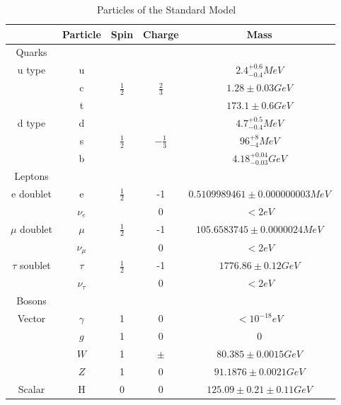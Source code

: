 \begin{table}[h]
\begin{center}
\footnotesize
\begin{tabular}[h]{|c||c|c|c|c|}
\hline
 & Particle & Spin & Charge & Mass \\
\hline\hline
Quarks &&&&\\
\hline
u type &u& & &${2.4^{+0.6}_{-0.4} MeV}$\\
 &c&${\frac{1}{2}}$&${\frac{2}{3}}$&${1.28\pm{0.03} GeV}$\\
 &t& & &${173.1\pm{0.6} GeV}$\\
\hline
d type & d& & & ${4.7^{+0.5}_{-0.4} MeV}$\\
 & s & ${\frac{1}{2}}$ & ${-\frac{1}{3}}$ & ${96^{+8}_{-4} MeV}$\\
 & b & & & ${4.18^{+0.04}_{-0.03} GeV}$\\
\hline\hline
Leptons &&&&\\
\hline
e doublet & e & ${\frac{1}{2}}$ & -1 &${0.5109989461\pm{}0.000000003 MeV}$\\
 & ${\nu_{e}}$ & & 0 & ${< 2 eV}$\\
 \hline
${\mu}$ doublet & ${\mu}$ & ${\frac{1}{2}}$ & -1 &${105.6583745\pm{}0.0000024 MeV}$\\
 & ${\nu_{\mu}}$ & & 0 & ${< 2 eV}$\\
 \hline
${\tau}$ soublet & ${\tau}$ & ${\frac{1}{2}}$ & -1 &${1776.86\pm{}0.12 GeV}$\\
 & ${\nu_{\tau}}$ & & 0 & ${< 2 eV}$\\
 \hline\hline
 Bosons &&&&\\
 \hline
 Vector & ${\gamma}$ & 1 & 0 & ${< 10^{-18} eV}$\\
 & ${g}$ & 1 & 0 & ${0}$\\
 & ${W}$ & 1 & ${\pm}$ & ${80.385\pm{}0.0015 GeV}$\\
 & ${Z}$ & 1 & 0 & ${91.1876\pm{}0.0021 GeV}$\\
 \hline
 Scalar & H & 0& 0 & ${125.09\pm{}0.21\pm{}0.11 GeV}$\\
 \hline
\end{tabular}
\caption[Particles of the Standard Model]{Particles of the Standard Model ~\cite{PhysRevD.98.030001}}
\label{tab:SM}
\end{center}
\end{table}

